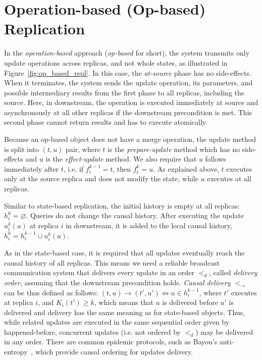 \section{Operation-based (Op-based) Replication}
\label{sec:operation-based_replication}

In the \textit{operation-based} approach (\textit{op-based} for short), the
system transmits only update operations across replicas, and not whole states,
as illustrated in Figure~\ref{fig:op_based_repl}. In this case, the
\textit{at-source} phase has no side-effects. When it terminates, the system
sends the update operation, its parameters, and possible intermediary results
from the first phase to all replicas, including the source. Here, in downstream,
the operation is executed immediately at source and asynchronously at all other
replicas if the downstream precondition is met. This second phase cannot return
results and has to execute atomically.

Because an op-based object does not have a merge operation, the update
method is split into $(t,u)$ pair, where $t$ is the \textit{prepare-update}
method which has no side-effects and $u$ is the \textit{effect-update} method.
We also require that $u$ follows immediately after $t$, i.e. if $f_{i}^{k-1} =
t$, then $f_{i}^{k} = u$. As explained above, $t$ executes only at the source
replica and does not modify the state, while $u$ executes at all replicas.

\begin{definition}
\begin{itshape}
Similar to state-based replication, the initial history is empty at all
replicas: $h_{i}^{0} = \varnothing$. Queries do not change the causal history.
After executing the update $u_{i}^{k}(a)$ at replica $i$ in downstream, it is
added to the local causal history, $h_{i}^{k} = h_{i}^{k-1} \cup
{u_{i}^{k}(a)}$.
\end{itshape}
\end{definition}

As in the state-based case, it is required that all updates eventually reach
the causal history of all replicas. This means we need a reliable broadcast
communication system that delivers every update in an order $<_{d}$, called
\textit{delivery order}, assuming that the downstream precondition holds.
\textit{Causal delivery} $<_{\rightarrow}$ can be thus defined as follows:
$(t,u) \rightarrow (t',u') \iff u \in h_{i}^{k-1}$, where $t'$ executes at
replica $i$, and $K_{i}(t') \geq k$, which means that $u$ is delivered before
$u'$ is delivered and delivery has the same meaning as for state-based objects.
Thus, while related updates are executed in the same sequential order given by
happened-before, concurrent updates (i.e. not ordered by $<_{d}$) may be
delivered in any order. There are common epidemic protocols, such as Bayou's
anti-entropy~\cite{Petersen:1997:FUP:268998.266711}, which provide causal
ordering for updates delivery.

